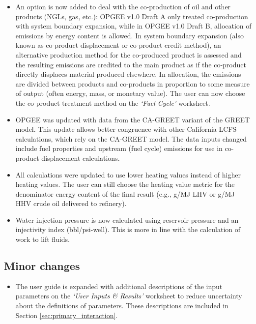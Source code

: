 \documentclass[11pt]{report}
\newcommand{\sheet}[1]{\textit{`{#1}'}}
\begin{document}
{{{{\begin{itemize}
\item An option is now added to deal with the co-production of oil and other products (NGLs, gas, etc.): OPGEE v1.0 Draft A only treated co-production with system boundary expansion, while in OPGEE v1.0 Draft B, allocation of emissions by energy content is allowed. In system boundary expansion (also known as co-product displacement or co-product credit method), an alternative production method for the co-produced product is assessed and the resulting emissions are credited to the main product as if the co-product directly displaces material produced elsewhere. In allocation, the emissions are divided between products and co-products in proportion to some measure of output (often energy, mass, or monetary value). The user can now choose the co-product treatment method on the \sheet{Fuel Cycle} worksheet. 

\item OPGEE was updated with data from the CA-GREET variant of the GREET model. This update allows better congruence with other California LCFS calculations, which rely on the CA-GREET model. The data inputs changed include fuel properties and upstream (fuel cycle) emissions for use in co-product displacement calculations.

\item All calculations were updated to use lower heating values instead of higher heating values. The user can still choose the heating value metric for the denominator energy content of the final result (e.g., g/MJ LHV or g/MJ HHV crude oil delivered to refinery).

\item Water injection pressure is now calculated using reservoir pressure and an injectivity index (bbl/psi-well). This is more in line with the calculation of work to lift fluids.

\end{itemize}

\subsection{Minor changes}

\begin{itemize}

\item The user guide is expanded with additional descriptions of the input parameters on the \sheet{User Inputs \& Results} worksheet to reduce uncertainty about the definitions of parameters. These descriptions are included in Section \ref{sec:primary_interaction}.


\end{itemize}}}}}
\end{document}
